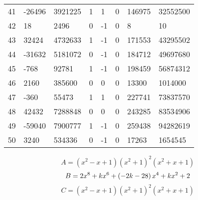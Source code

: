 \documentclass{amsart}
\begin{document}
\begin{longtable}{|l|l|l|lllll|}
41&-26496&3921225&1&1&0&146975&32552500\\
42&18&2496&0&-1&0&8&10\\
43&32424&4732633&1&-1&0&171553&43295502\\
44&-31632&5181072&0&-1&0&184712&49697680\\
45&-768&92781&1&-1&0&198459&56874312\\
46&2160&385600&0&0&0&13300&1014000\\
47&-360&55473&1&1&0&227741&73837570\\
48&42432&7288848&0&0&0&243285&83534906\\
49&-59040&7900777&1&-1&0&259438&94282619\\
50&3240&534336&0&-1&0&17263&1654545\\
\hline
\end{longtable}
$$A=(x^2
 - x
 + 1)(x^2
 + 1)^{2}(x^2
 + x
 + 1)$$
$$B=2\*x^8
 + k\*x^6
 + \left(-2\*k
 - 28\right) \*x^4
 + k\*x^2
 + 2$$
$$C=(x^2
 - x
 + 1)(x^2
 + 1)^{2}(x^2
 + x
 + 1)$$
\end{document}

